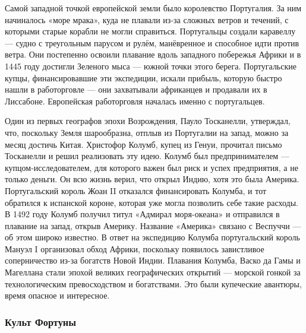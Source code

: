 Самой западной точкой европейской земли было королевство Португалия. За ним начиналось «море мрака», куда не плавали из-за сложных ветров и течений, с которыми старые корабли не могли справиться. Португальцы создали каравеллу --- судно с треугольным парусом и рулём, манёвренное и способное идти против ветра. Они постепенно освоили плавание вдоль западного побережья Африки и в 1445 году достигли Зеленого мыса --- южной точки этого берега. Португальские купцы, финансировавшие эти экспедиции, искали прибыль, которую быстро нашли в работорговле --- они захватывали африканцев и продавали их в Лиссабоне. Европейская работорговля началась именно с португальцев.

Один из первых географов эпохи Возрождения, Пауло Тосканелли, утверждал, что, поскольку Земля шарообразна, отплыв из Португалии на запад, можно за месяц достичь Китая. Христофор Колумб, купец из Генуи, прочитал письмо Тосканелли и решил реализовать эту идею. Колумб был предпринимателем --- купцом-исследователем, для которого важен был риск и успех предприятия, а не только деньги. Он всю жизнь верил, что открыл Индию, хотя это была Америка. Португальский король Жоан II отказался финансировать Колумба, и тот обратился к испанской короне, которая уже могла позволить себе такие расходы. В 1492 году Колумб получил титул «Адмирал моря-океана» и отправился в плавание на запад, открыв Америку. Название «Америка» связано с Веспуччи --- об этом широко известно. В ответ на экспедицию Колумба португальский король Мануэл I организовал обход Африки, поскольку появилось завистливое соперничество из-за богатств Новой Индии. Плавания Колумба, Васко да Гамы и Магеллана стали эпохой великих географических открытий --- морской гонкой за технологическим превосходством и богатствами. Это были купеческие авантюры, время опасное и интересное.

\subsubsection{Культ Фортуны}

